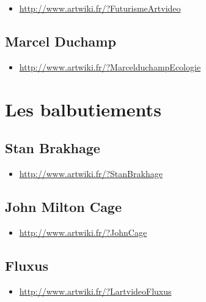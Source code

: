 \documentclass[
]{book}
\providecommand{\tightlist}{%
  \setlength{\itemsep}{0pt}\setlength{\parskip}{0pt}}
\begin{document}
\begin{itemize}
\tightlist
\item
  \url{http://www.artwiki.fr/?FuturismeArtvideo}
\end{itemize}

\hypertarget{marcel-duchamp}{%
\subsection{Marcel Duchamp}\label{marcel-duchamp}}

\begin{itemize}
\tightlist
\item
  \url{http://www.artwiki.fr/?MarcelduchampEcologie}
\end{itemize}

\hypertarget{les-balbutiements}{%
\section{Les balbutiements}\label{les-balbutiements}}

\hypertarget{stan-brakhage}{%
\subsection{Stan Brakhage}\label{stan-brakhage}}

\begin{itemize}
\tightlist
\item
  \url{http://www.artwiki.fr/?StanBrakhage}
\end{itemize}

\hypertarget{john-milton-cage}{%
\subsection{John Milton Cage}\label{john-milton-cage}}

\begin{itemize}
\tightlist
\item
  \url{http://www.artwiki.fr/?JohnCage}
\end{itemize}

\hypertarget{fluxus}{%
\subsection{Fluxus}\label{fluxus}}

\begin{itemize}
\tightlist
\item
  \url{http://www.artwiki.fr/?LartvideoFluxus}
\end{itemize}
\end{document}
